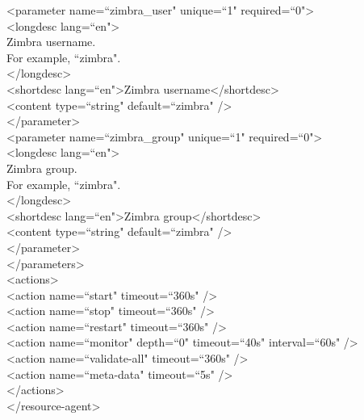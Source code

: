 \documentclass[a4paper, 12pt]{book}
\begin{document}
\noindent \textless parameter name=``zimbra\_user" unique=``1" required=``0"\textgreater\\
\textless longdesc lang=``en"\textgreater\\
\indent Zimbra username.\\
\indent For example, ``zimbra".\\
\textless /longdesc\textgreater\\
\textless shortdesc lang=``en"\textgreater Zimbra username\textless /shortdesc\textgreater\\
\textless content type=``string" default=``zimbra" /\textgreater\\
\textless /parameter\textgreater\\

\noindent \textless parameter name=``zimbra\_group" unique=``1" required=``0"\textgreater\\
\textless longdesc lang=``en"\textgreater\\
\indent Zimbra group.\\
\indent For example, ``zimbra".\\
\textless /longdesc\textgreater\\
\textless shortdesc lang=``en"\textgreater Zimbra group\textless /shortdesc\textgreater\\
\textless content type=``string" default=``zimbra" /\textgreater\\
\textless /parameter\textgreater\\

\noindent \textless /parameters\textgreater\\

\noindent \textless actions\textgreater\\
\textless action name=``start"   timeout=``360s" /\textgreater\\
\textless action name=``stop"    timeout=``360s" /\textgreater\\
\textless action name=``restart"  timeout=``360s" /\textgreater\\
\textless action name=``monitor" depth=``0"  timeout=``40s" interval=``60s" /\textgreater\\
\textless action name=``validate-all"  timeout=``360s" /\textgreater\\
\textless action name=``meta-data"  timeout=``5s" /\textgreater\\
\textless /actions\textgreater\\
\textless /resource-agent\textgreater\\
\end{document}
